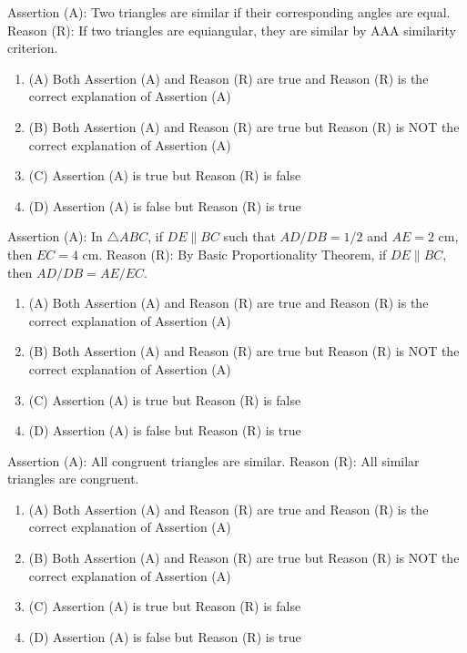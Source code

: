 \documentclass[12pt,a4paper]{exam}
\begin{document}
\begin{questions}
\question[1] Assertion (A): Two triangles are similar if their corresponding angles are equal. Reason (R): If two triangles are equiangular, they are similar by AAA similarity criterion.
\begin{enumerate}[label=(\Alph*)]
  \item (A) Both Assertion (A) and Reason (R) are true and Reason (R) is the correct explanation of Assertion (A)
  \item (B) Both Assertion (A) and Reason (R) are true but Reason (R) is NOT the correct explanation of Assertion (A)
  \item (C) Assertion (A) is true but Reason (R) is false
  \item (D) Assertion (A) is false but Reason (R) is true
\end{enumerate}
\vspace{0.15cm}

\question[1] Assertion (A): In $\triangle ABC$, if $DE \parallel BC$ such that $AD/DB = 1/2$ and $AE = 2 \text{ cm}$, then $EC = 4 \text{ cm}$. Reason (R): By Basic Proportionality Theorem, if $DE \parallel BC$, then $AD/DB = AE/EC$.
\begin{enumerate}[label=(\Alph*)]
  \item (A) Both Assertion (A) and Reason (R) are true and Reason (R) is the correct explanation of Assertion (A)
  \item (B) Both Assertion (A) and Reason (R) are true but Reason (R) is NOT the correct explanation of Assertion (A)
  \item (C) Assertion (A) is true but Reason (R) is false
  \item (D) Assertion (A) is false but Reason (R) is true
\end{enumerate}
\vspace{0.15cm}

\question[1] Assertion (A): All congruent triangles are similar. Reason (R): All similar triangles are congruent.
\begin{enumerate}[label=(\Alph*)]
  \item (A) Both Assertion (A) and Reason (R) are true and Reason (R) is the correct explanation of Assertion (A)
  \item (B) Both Assertion (A) and Reason (R) are true but Reason (R) is NOT the correct explanation of Assertion (A)
  \item (C) Assertion (A) is true but Reason (R) is false
  \item (D) Assertion (A) is false but Reason (R) is true
\end{enumerate}
\vspace{0.15cm}


\end{questions}
\end{document}

